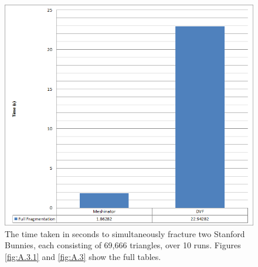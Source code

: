 \begin{figure}[h!]
\centerline{\includegraphics[scale=0.95]{../Logs/double_bunny_latency.png}}
\caption{The time taken in seconds to simultaneously fracture two Stanford Bunnies, each consisting of 69,666 triangles, over 10 runs. Figures \ref{fig:A.3.1} and \ref{fig:A.3} show the full tables.}
\label{fig:4.25}
\end{figure}

\FloatBarrier

